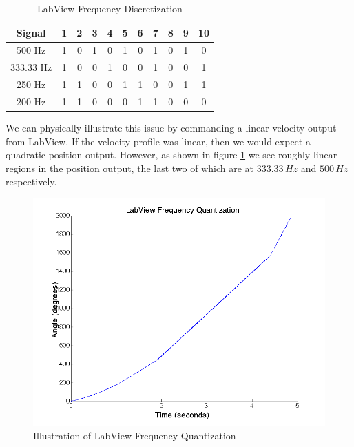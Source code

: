 \documentclass{article}
\theoremstyle{plain}
\theoremstyle{definition}
\theoremstyle{remark}
\begin{document}
\begin{table}
\begin{center}
    \begin{tabular}{|c|c|c|c|c|c|c|c|c|c|c|}
        \hline
        Signal    & 1 & 2 & 3 & 4 & 5 & 6 & 7 & 8 & 9 & 10 \\ \hline
        500 Hz    & 1 & 0 & 1 & 0 & 1 & 0 & 1 & 0 & 1 & 0  \\ 
        333.33 Hz & 1 & 0 & 0 & 1 & 0 & 0 & 1 & 0 & 0 & 1  \\ 
        250 Hz    & 1 & 1 & 0 & 0 & 1 & 1 & 0 & 0 & 1 & 1  \\ 
        200 Hz    & 1 & 1 & 0 & 0 & 0 & 1 & 1 & 0 & 0 & 0  \\
        \hline
    \end{tabular}
\caption{LabView Frequency Discretization}
\label{Q2_T2}
\end{center}
\end{table}

We can physically illustrate this issue by commanding a linear velocity output from LabView.  If the velocity profile was linear, then we would expect a quadratic position output.  However, as shown in figure \ref{Q2_3} we see roughly linear regions in the position output, the last two of which are at $333.33 \, Hz$ and $500 \, Hz$ respectively. 


\begin{figure}[hbt]
\begin{center}
\includegraphics[width = 13cm]{frequencyQuantization.png}
\caption{Illustration of LabView Frequency Quantization}
\label{Q2_3}
\end{center}
\end{figure}
\end{document}
